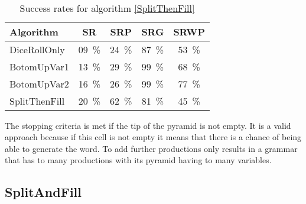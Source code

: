 \noindent
{}
\\
\begin{table}[H]
	\centering
	\begin{tabular}{ | l || c |c |c |c | }
		\hline
		Algorithm 		& SR 	& SRP 	& SRG 	& SRWP   	\\ \hline
		\hline
		DiceRollOnly 	& 09~\%	& 24~\% & 87~\% & 53~\%		\\ \hline
		BotomUpVar1 	& 13~\% & 29~\% & 99~\% & 68~\% 	\\ \hline
		BotomUpVar2 	& 16~\% & 26~\% & 99~\% & 77~\% 	\\ \hline
		SplitThenFill 	& 20~\% & 62~\% & 81~\% & 45~\% 	\\ \hline
	\end{tabular}
	\caption{Success rates for algorithm \ref{SplitThenFill}}
	\label{SplitThenFillSR}
\end{table}
\noindent The stopping criteria is met if the tip of the pyramid is not empty. It is a valid approach because if this cell is not empty it means that there is a chance of being able to generate the word. To add further productions only results in a grammar that has to many productions with its pyramid having to many variables.
\pagebreak

\subsection{SplitAndFill}
